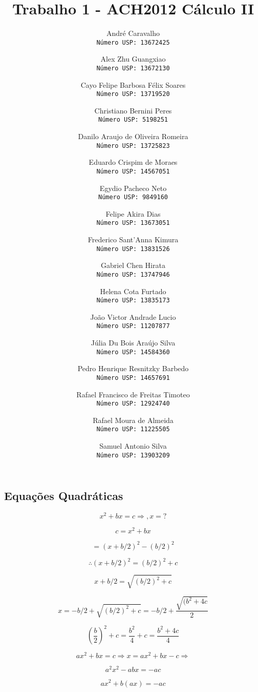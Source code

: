 \documentclass{article}
\title{Trabalho 1 - ACH2012 Cálculo II}
\author{
  André Caravalho\\
  \texttt{Número USP: 13672425}
  \and
  Alex Zhu Guangxiao\\
  \texttt{Número USP: 13672130}
  \and
  Cayo Felipe Barbosa Félix Soares\\
  \texttt{Número USP: 13719520}
  \and
  Christiano Bernini Peres\\
  \texttt{Número USP: 5198251}
  \and
 Danilo Araujo de Oliveira Romeira\\
  \texttt{Número USP: 13725823}
  \and
 Eduardo Crispim de Moraes\\
  \texttt{Número USP: 14567051}
  \and
 Egydio Pacheco Neto\\
  \texttt{Número USP: 9849160}
  \and
 Felipe Akira Dias\\
  \texttt{Número USP: 13673051}
  \and
 Frederico Sant'Anna Kimura\\
  \texttt{Número USP: 13831526}
  \and
 Gabriel Chen Hirata\\
  \texttt{Número USP: 13747946}
  \and
 Helena Cota Furtado\\
  \texttt{Número USP: 13835173}
  \and
 João Victor Andrade Lucio\\
  \texttt{Número USP: 11207877}
  \and
 Júlia Du Bois Araújo Silva\\
  \texttt{Número USP: 14584360}
  \and
 Pedro Henrique Resnitzky Barbedo\\
  \texttt{Número USP: 14657691}
  \and
 Rafael Francisco de Freitas Timoteo\\
  \texttt{Número USP: 12924740}
  \and
 Rafael Moura de Almeida\\
  \texttt{Número USP: 11225505}
  \and
 Samuel Antonio Silva\\
  \texttt{Número USP: 13903209}
}
\date{}
\begin{document}
\maketitle
\pagebreak


\begin{center}
\section*{Equações Quadráticas}
\end{center}

\[
    x^2 + bx = c \Rightarrow, x = ?
\]


\[
c = x^2 + bx
\]

\[
= (x+b/2)^2 - (b/2)^2
\]

\[
\therefore (x+b/2)^2 = (b/2)^2 + c
\]

\[
x + b/2 = \sqrt{(b/2)^2 + c}
\]

\[
\boxed{x =  -b/2 + \sqrt{(b/2)^2 + c}} = -b/2 + \frac{\sqrt{(b^2 + 4c}}{2}
\]

\[
(\frac{b}{2})^2 + c = \frac{b^2}{4} + c = \frac{b^2 + 4c}{4}
\]

\[
ax^2 + bx = c \Rightarrow x = ax^2 + bx - c \Rightarrow
\]

\[
a^2x^2 - abx = -ac
\]

\[
ax^2 + b(ax) = -ac
\]


\end{document}
